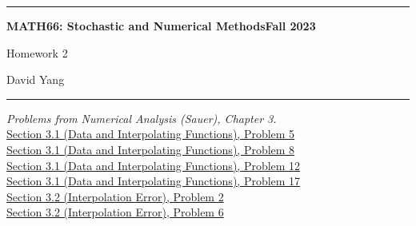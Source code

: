 \documentclass[11pt]{article}
\theoremstyle{definition}
\begin{document}
	\hrule
	\begin{center}
        \textbf{MATH66: Stochastic and Numerical Methods}\hfill \textbf{Fall 2023}\newline

		{\Large Homework 2}

		David Yang
	\end{center}

\hrule

\vspace{1em}

\textit{Problems from Numerical Analysis (Sauer), Chapter 3.} \\

\underline{Section 3.1 (Data and Interpolating Functions), Problem 5} \\

\underline{Section 3.1 (Data and Interpolating Functions), Problem 8} \\

\underline{Section 3.1 (Data and Interpolating Functions), Problem 12} \\

\underline{Section 3.1 (Data and Interpolating Functions), Problem 17} \\

\underline{Section 3.2 (Interpolation Error), Problem 2} \\

\underline{Section 3.2 (Interpolation Error), Problem 6} \\
\end{document}
